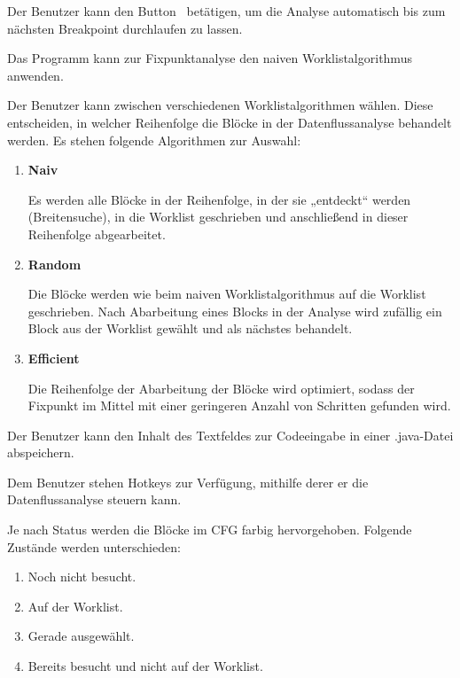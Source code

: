 Der Benutzer kann den Button  \faPlay\  betätigen, um die Analyse automatisch bis zum nächsten Breakpoint durchlaufen zu lassen.

Das Programm kann zur Fixpunktanalyse den naiven Worklistalgorithmus anwenden.

Der Benutzer kann zwischen verschiedenen Worklistalgorithmen wählen.
Diese entscheiden, in welcher Reihenfolge die Blöcke in der Datenflussanalyse behandelt werden.
Es stehen folgende Algorithmen zur Auswahl:
\begin{enumerate}[label=(\alph*)]
\item \textbf{Naiv} \par
Es werden alle Blöcke in der Reihenfolge, in der sie „entdeckt“ werden (Breitensuche), in die Worklist geschrieben und anschließend in dieser Reihenfolge abgearbeitet.
\item \textbf{Random} \par
Die Blöcke werden wie beim naiven Worklistalgorithmus auf die Worklist geschrieben. Nach Abarbeitung eines Blocks in der Analyse wird zufällig ein Block aus der Worklist gewählt und als nächstes behandelt.
\item \textbf{Efficient} \par
Die Reihenfolge der Abarbeitung der Blöcke wird optimiert, sodass der Fixpunkt im Mittel mit einer geringeren Anzahl von Schritten gefunden wird.
\end{enumerate}

Der Benutzer kann den Inhalt des Textfeldes zur Codeeingabe in einer .java-Datei abspeichern.

Dem Benutzer stehen Hotkeys zur Verfügung, mithilfe derer er die Datenflussanalyse steuern kann.

Je nach Status werden die Blöcke im CFG farbig hervorgehoben. Folgende Zustände werden unterschieden:
\begin{enumerate}[label=(\alph*)]
\item Noch nicht besucht.
\item Auf der Worklist.
\item Gerade ausgewählt.
\item Bereits besucht und nicht auf der Worklist.
\end{enumerate}

